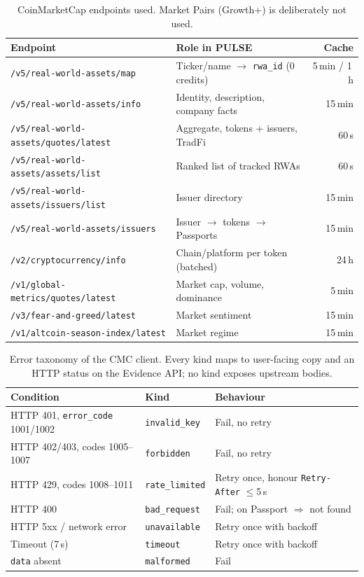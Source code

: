 \documentclass[11pt]{article}
\newcommand{\code}[1]{\texttt{\small #1}}
\begin{document}
\begin{table}[t]
\centering\small
\begin{tabularx}{\linewidth}{@{}lXr@{}}
\toprule
Endpoint & Role in \textsc{PULSE} & Cache\\
\midrule
\code{/v5/real-world-assets/map} & Ticker/name \(\to\) \code{rwa\_id} (0 credits) & 5\,min / 1\,h\\
\code{/v5/real-world-assets/info} & Identity, description, company facts & 15\,min\\
\code{/v5/real-world-assets/quotes/latest} & Aggregate, tokens + issuers, TradFi & 60\,s\\
\code{/v5/real-world-assets/assets/list} & Ranked list of tracked RWAs & 60\,s\\
\code{/v5/real-world-assets/issuers/list} & Issuer directory & 15\,min\\
\code{/v5/real-world-assets/issuers} & Issuer \(\to\) tokens \(\to\) Passports & 15\,min\\
\code{/v2/cryptocurrency/info} & Chain/platform per token (batched) & 24\,h\\
\code{/v1/global-metrics/quotes/latest} & Market cap, volume, dominance & 5\,min\\
\code{/v3/fear-and-greed/latest} & Market sentiment & 15\,min\\
\code{/v1/altcoin-season-index/latest} & Market regime & 15\,min\\
\bottomrule
\end{tabularx}
\caption{CoinMarketCap endpoints used. Market Pairs (Growth+) is deliberately not used.}
\label{tab:endpoints}
\end{table}

\begin{table}[t]
\centering\small
\begin{tabular}{@{}lll@{}}
\toprule
Condition & Kind & Behaviour\\
\midrule
HTTP 401, \code{error\_code} 1001/1002 & \code{invalid\_key} & Fail, no retry\\
HTTP 402/403, codes 1005--1007 & \code{forbidden} & Fail, no retry\\
HTTP 429, codes 1008--1011 & \code{rate\_limited} & Retry once, honour \code{Retry-After} \(\le\)5\,s\\
HTTP 400 & \code{bad\_request} & Fail; on Passport \(\Rightarrow\) not found\\
HTTP 5xx / network error & \code{unavailable} & Retry once with backoff\\
Timeout (7\,s) & \code{timeout} & Retry once with backoff\\
\code{data} absent & \code{malformed} & Fail\\
\bottomrule
\end{tabular}
\caption{Error taxonomy of the CMC client. Every kind maps to user-facing copy and an HTTP status on the Evidence API; no kind exposes upstream bodies.}
\label{tab:errors}
\end{table}
\end{document}
